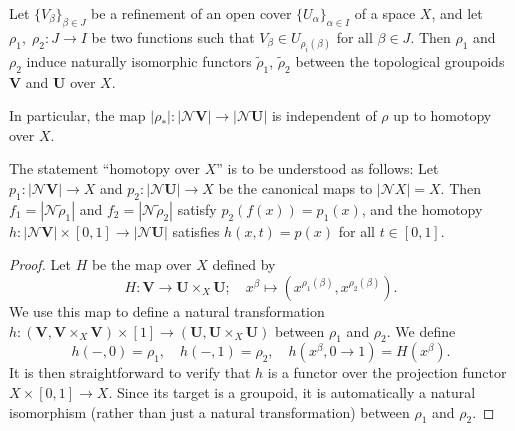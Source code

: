 \documentclass[a4paper,openany]{scrbook}
\newcommand{\nerve}{\mathcal N}
\begin{document}
\begin{prop} \label{prop:refinementhomotopyinvariant}
Let $\{V_\beta\}_{\beta \in J}$ be a refinement of an open cover $\{U_\alpha\}_{\alpha \in I}$ of a space $X$, and let $\rho_1,\;\rho_2\colon J \to I$ be two functions such that $V_\beta \in U_{\rho_i(\beta)}$ for all $\beta \in J$. Then $\rho_1$ and $\rho_2$ induce naturally isomorphic functors $\tilde \rho_1$, $\tilde \rho_2$ between the topological groupoids $\mathbf V$ and $\mathbf U$ over $X$.

In particular, the map $|\rho_*|\colon |\nerve\mathbf V| \to |\nerve \mathbf U|$ is independent of $\rho$ up to homotopy over $X$.
\end{prop}

The statement ``homotopy over $X$'' is to be understood as follows: Let $p_1\colon |\nerve \mathbf V| \to X$ and $p_2\colon |\nerve \mathbf U| \to X$ be the canonical maps to $|\nerve X| = X$. Then $f_1=|\nerve \tilde \rho_1|$ and $f_2=|\nerve \tilde \rho_2|$ satisfy $p_2(f(x))=p_1(x)$, and the homotopy $h\colon |\nerve \mathbf V| \times [0,1] \to |\nerve \mathbf U|$ satisfies $h(x,t)=p(x)$ for all $t \in [0,1]$.

\begin{proof}
Let $H$ be the map over $X$ defined by
\[
H\colon \mathbf V \to \mathbf U \times_X \mathbf U; \quad x^\beta \mapsto (x^{\rho_1(\beta)},x^{\rho_2(\beta)}).
\]
We use this map to define a natural transformation $h\colon (\mathbf V,\mathbf V \times_X \mathbf V) \times [1] \to (\mathbf U,\mathbf U \times_X \mathbf U)$ between $\rho_1$ and $\rho_2$. We define
\[
h(-,0) = \rho_1, \quad h(-,1) = \rho_2, \quad h(x^\beta,0 \to 1) = H(x^\beta).
\]
It is then straightforward to verify that $h$ is a functor over the projection functor $X \times [0,1] \to X$. Since its target is a groupoid, it is automatically a natural isomorphism (rather than just a natural transformation) between $\rho_1$ and $\rho_2$.
\end{proof}
\end{document}
